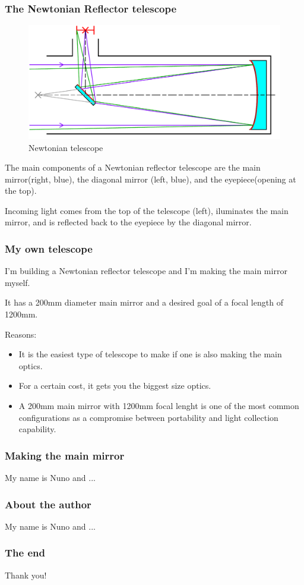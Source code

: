 \documentclass{beamer}
\begin{document}
\begin{frame}
\frametitle{The Newtonian Reflector telescope}
\begin{figure}
\includegraphics[scale=0.3]{assets/Newtonian_telescope2.pdf}
\caption{Newtonian telescope}
\end{figure}
The main components of a Newtonian reflector telescope are the main mirror\footnotemark (right, blue),
the diagonal mirror (left, blue), and the eyepiece\footnotemark (opening at the top).

Incoming light comes from the top of the telescope (left), iluminates the main mirror, and is reflected back to the eyepiece by the diagonal mirror.
\end{frame}

\begin{frame}
\frametitle{My own telescope}
I'm building a Newtonian reflector telescope and I'm making the main mirror myself.

It has a 200mm diameter main mirror and a desired goal of a focal length of 1200mm.

Reasons:
\begin{itemize}
\item It is the easiest type of telescope to make if one is also making the main optics.
\item For a certain cost, it gets you the biggest size optics.
\item A 200mm main mirror with 1200mm focal lenght is one of the most common configurations as a compromise between portability and light collection capability.
\end{itemize}
\end{frame}


\begin{frame}
\frametitle{Making the main mirror}
My name is Nuno and ...
\end{frame}

\begin{frame}
\frametitle{About the author}
My name is Nuno and ...
\end{frame}

\begin{frame}
\frametitle{The end}
Thank you!
\end{frame}
\end{document}
